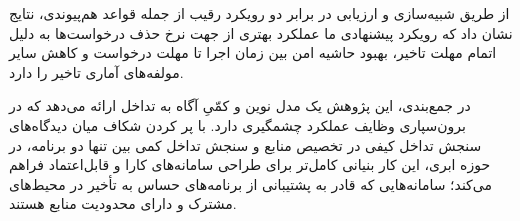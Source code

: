از طریق شبیه‌سازی و ارزیابی در برابر دو رویکرد رقیب از جمله قواعد هم‌پیوندی، نتایج نشان داد که رویکرد پیشنهادی ما عملکرد بهتری از جهت نرخ حذف درخواست‌ها به دلیل اتمام مهلت تاخیر، بهبود حاشیه امن بین زمان اجرا تا مهلت درخواست و کاهش سایر مولفه‌های آماری تاخیر را دارد. 

در جمع‌بندی، این پژوهش یک مدل نوین و کمّیِ آگاه به تداخل ارائه می‌دهد که در برون‌سپاری وظایف  عملکرد چشمگیری دارد. با پر کردن شکاف میان دیدگاه‌های سنجش تداخل کیفی در تخصیص منابع و سنجش تداخل کمی بین تنها دو برنامه، در حوزه ابری، این کار بنیانی کامل‌تر برای طراحی سامانه‌های  کارا و قابل‌اعتماد فراهم می‌کند؛ سامانه‌هایی که قادر به پشتیبانی از برنامه‌های حساس به تأخیر در محیط‌های مشترک و دارای محدودیت منابع هستند.